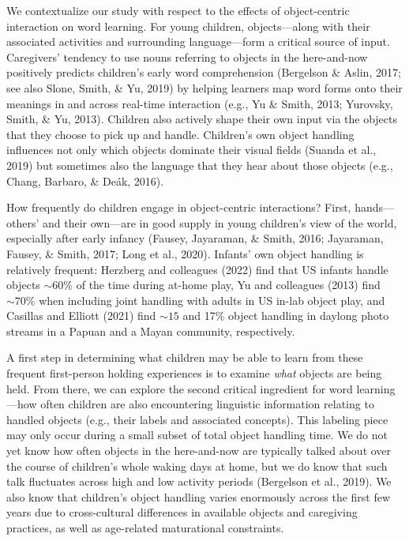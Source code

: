 \documentclass[10pt, letterpaper]{article}
\begin{document}
We contextualize our study with respect to the effects of object-centric
interaction on word learning. For young children, objects---along with
their associated activities and surrounding language---form a critical
source of input. Caregivers' tendency to use nouns referring to objects
in the here-and-now positively predicts children's early word
comprehension (Bergelson \& Aslin, 2017; see also Slone, Smith, \& Yu,
2019) by helping learners map word forms onto their meanings in and
across real-time interaction (e.g., Yu \& Smith, 2013; Yurovsky, Smith,
\& Yu, 2013). Children also actively shape their own input via the
objects that they choose to pick up and handle. Children's own object
handling influences not only which objects dominate their visual fields
(Suanda et al., 2019) but sometimes also the language that they hear
about those objects (e.g., Chang, Barbaro, \& Deák, 2016).

How frequently do children engage in object-centric interactions? First,
hands---others' and their own---are in good supply in young children's
view of the world, especially after early infancy (Fausey, Jayaraman, \&
Smith, 2016; Jayaraman, Fausey, \& Smith, 2017; Long et al., 2020).
Infants' own object handling is relatively frequent: Herzberg and
colleagues (2022) find that US infants handle objects \({\sim}60\%\) of
the time during at-home play, Yu and colleagues (2013) find
\({\sim}70\%\) when including joint handling with adults in US in-lab
object play, and Casillas and Elliott (2021) find \({\sim}15\) and 17\%
object handling in daylong photo streams in a Papuan and a Mayan
community, respectively.

A first step in determining what children may be able to learn from
these frequent first-person holding experiences is to examine
\emph{what} objects are being held. From there, we can explore the
second critical ingredient for word learning---how often children are
also encountering linguistic information relating to handled objects
(e.g., their labels and associated concepts). This labeling piece may
only occur during a small subset of total object handling time. We do
not yet know how often objects in the here-and-now are typically talked
about over the course of children's whole waking days at home, but we do
know that such talk fluctuates across high and low activity periods
(Bergelson et al., 2019). We also know that children's object handling
varies enormously across the first few years due to cross-cultural
differences in available objects and caregiving practices, as well as
age-related maturational constraints.
\end{document}
